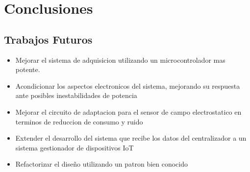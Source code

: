 \chapter{Conclusiones} %
\label{cha:conclusiones}


\section{Trabajos Futuros} %
\label{sec:trabajos_futuros}

\begin{itemize}
	\item Mejorar el sistema de adquisicion utilizando un microcontrolador mas potente.
	\item Acondicionar los aspectos electronicos del sistema, mejorando su respuesta ante posibles inestabilidades de potencia
	\item Mejorar el circuito de adaptacion para el sensor de campo electrostatico en terminos de reduccion de consumo y ruido
	\item Extender el desarrollo del sistema que recibe los datos del centralizador a un sistema gestionador de dispositivos IoT
	\item Refactorizar el diseño utilizando un patron bien conocido
\end{itemize}



